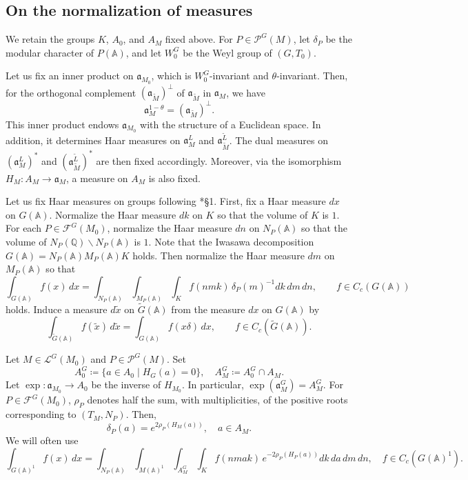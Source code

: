 \documentclass[12pt]{amsart}
\theoremstyle{definition}
\theoremstyle{plain}
\theoremstyle{remark}
\def\Q{\mathbb{Q}}%
\def\A{\mathbb{A}}%
\def\bs{\backslash}%
\newcommand{\fa}{\mathfrak{a}}
\newcommand{\cF}{\mathcal{F}}
\newcommand{\cL}{\mathcal{L}}
\newcommand{\cP}{\mathcal{P}}
\numberwithin{equation}{section}
\newcommand{\tG}{\widetilde{G}}
\newcommand{\tM}{\widetilde{M}}
\newcommand{\tL}{\widetilde{L}}
\begin{document}
\subsection{On the normalization of measures}\label{sec:measure}




We retain the groups $K$, $A_0$, and $A_M$ fixed above.
For $P\in\cP^G(M)$, let $\delta_P$ be the modular character
of $P(\A)$, and let $W_0^G$ be the Weyl group of $(G,T_0)$.

Let us fix an inner product on $\fa_{M_0}$, which is $W_0^G$-invariant and $\theta$-invariant.
Then, for the orthogonal complement $(\fa_{\tM})^\perp$ of $\fa_{\tM}$ in $\fa_M$, we have
\[
\fa_M^{1-\theta}=(\fa_{\tM})^\perp.
\]
This inner product endows $\fa_{M_0}$ with the structure of a Euclidean space. 
In addition, it determines Haar measures on $\fa_{M}^L$ and $\fa_{\tM}^{\tL}$.
The dual measures on $(\fa_{M}^{L})^*$ and $(\fa_{\tM}^{\tL})^*$ are then fixed accordingly.
Moreover, via the isomorphism $H_M\colon A_M\to \fa_M$, a measure on $A_M$ is also fixed.


Let us fix Haar measures on groups following \cite{Art78}*{\S1}. 
First, fix a Haar measure $dx$ on $G(\A)$. 
Normalize the Haar measure $dk$ on $K$ so that the volume of $K$ is $1$. 
For each $P\in\cF^G(M_0)$, normalize the Haar measure $dn$ on $N_P(\A)$ so that the volume of $N_P(\Q)\bs N_P(\A)$ is $1$. 
Note that the Iwasawa decomposition $G(\A)=N_P(\A) M_P(\A)K$ holds. 
Then normalize the Haar measure $dm$ on $M_P(\A)$ so that
\[
\int_{G(\A)} f(x)\, dx =\int_{N_P(\A)} \int_{M_P(\A)} \int_K f(nmk) \, \delta_P(m)^{-1}  dk\, dm \, dn, \qquad  f\in C_c(G(\A)) 
\]
holds.
Induce a measure $d\widetilde{x}$ on $\tG(\A)$ from the measure $dx$ on $G(\A)$ by
\[
\int_{\tG(\A)}f(\widetilde{x})\, d\widetilde{x}=\int_{G(\A)} f(x\delta) \, dx,\qquad f\in C_c(\tG(\A)).
\]



Let $M\in\cL^G(M_0)$ and $P\in \cP^G(M)$. 
Set
\[
A_0^G\coloneqq\{a\in A_0 \mid H_G(a)=0\}, \quad A_M^G\coloneqq A_0^G\cap A_M. 
\]
Let $\exp\colon\fa_{M_0}\to A_0$ be the inverse of $H_{M_0}$. In particular, $\exp(\fa_{M}^G)=A_M^G$. 
For $P\in\cF^G(M_0)$, $\rho_P$ denotes half the sum, with multiplicities, of the positive
roots corresponding to $(T_M,N_P)$.
Then, 
\[
\delta_P(a)=e^{2\rho_P(H_M(a))} ,\quad a\in A_M.
\]
We will often use
\[
\int_{G(\A)^1} f(x)\, dx =\int_{N_P(\A)} \int_{M(\A)^1}\int_{A_M^G} \int_K f(nmak) \, e^{-2\rho_P(H_P(a))}  dk\, da\, dm \, dn, \quad  f\in C_c(G(\A)^1) .
\]
\end{document}
